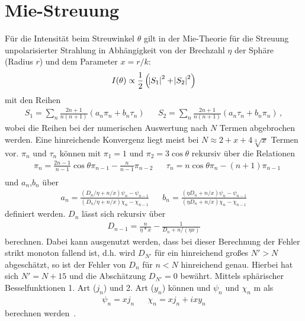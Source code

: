 \chapter{Mie-Streuung}
\label{app:mie}
Für die Intensität beim Streuwinkel $\theta$ gilt in der Mie-Theorie für die Streuung unpolarisierter Strahlung in Abhängigkeit von der Brechzahl $\eta$ der Sphäre (Radius $r$) und dem Parameter $x=r/k$:
\begin{equation}
	I(\theta)\propto\frac{1}{2}\left(\abs{S_1}^2+\abs{S_2}^2\right)
\end{equation} 
mit den Reihen
\begin{align}
	S_1=\sum_n{\frac{2n+1}{n(n+1)}(a_n\pi_n+b_n\tau_n)} &   & S_2=\sum_n{\frac{2n+1}{n(n+1)}(a_n\tau_n+b_n\pi_n)}\,, 
\end{align}
wobei die Reihen bei der numerischen Auswertung nach $N$ Termen abgebrochen werden. Eine hinreichende Konvergenz liegt meist bei $N\approx2+x+4\sqrt[3]{x}$ Termen vor.  $\pi_n$ und $\tau_n$ können mit $\pi_1=1$ und  $\pi_2=3\cos{\theta}$ rekursiv über die Relationen
\begin{align}
	  & \pi_n=\frac{2n-1}{n-1}\cos{\theta}\pi_{n-1}-\frac{n}{n-1}\pi_{n-2} &   & \tau_n=n\cos{\theta}\pi_n-(n+1)\pi_{n-1} \\
\end{align}
und $a_n$,$b_n$ über 
\begin{align}
	a_n=\frac{(D_n/\eta+n/x)\psi_n-\psi_{n-1}}{(D_n/\eta+n/x)\chi_n-\chi_{n-1}} &   &   
	b_n=\frac{(\eta D_n+n/x)\psi_n-\psi_{n-1}}{(\eta D_n+n/x)\chi_n-\chi_{n-1}}
\end{align} definiert werden. $D_n$ lässt sich rekursiv über
\begin{align}
	D_{n-1}=\frac{n}{\eta*x}-\frac{1}{D_n+n/(\eta x)} 
\end{align} 
berechnen. Dabei kann ausgenutzt werden, dass bei dieser Berechnung der Fehler strikt monoton fallend ist, d.h. wird $D_{N'}$ für ein hinreichend großes $N'>N$ abgeschätzt, so ist der Fehler von $D_n$ für $n<N$ hinreichend genau. Hierbei hat sich $N'=N+15$ und die Abschätzung $D_{N'}=0$ bewährt. Mittels sphärischer Besselfunktionen 1. Art ($j_n$) und 2. Art ($y_n$) können und $\psi_n$ und $\chi_n$ m als 
\begin{align}
	\psi_n=x j_n &   & \chi_n=x j_n+ixy_n 
\end{align}
berechnen werden~\cite{bohren1983,maetzler2002}.

